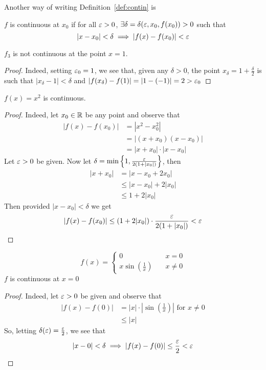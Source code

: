 Another way of writing Definition~\ref{def:contin} is
\begin{definition*}[32]
    $f$ is continuous at $x_0$ if for all $\varepsilon > 0$, $\exists\delta=\delta(\varepsilon, x_0, f(x_0)) > 0$ such that
    $$|x-x_0| < \delta \implies |f(x) - f(x_0)| < \varepsilon$$
\end{definition*}

\begin{example*}
    $f_3$ is not continuous at the point $x = 1$. 
\end{example*}
\begin{proof}
    Indeed, setting $\varepsilon_0 = 1$, 
    we see that, given any $\delta > 0$, the point $x_\delta = 1 + \frac{\delta}{2}$ is such that $|x_\delta - 1| < \delta$ and $|f(x_\delta) - f(1)| = |1-(-1)|=2 > \varepsilon_0$
\end{proof}

\begin{example*}
    $f(x) = x^2$ is continuous.
\end{example*}
\begin{proof}
    Indeed, let $x_0 \in \mathbb R$ be any point and observe that
    \begin{align*}
        |f(x) - f(x_0)| &= |x^2-x_0^2| \\
        &= |(x+x_0)(x-x_0)| \\
        &= |x+x_0|\cdot|x-x_0|
    \end{align*}
    Let $\varepsilon > 0$ be given. Now let $\delta = \min\left\{1, \frac{\varepsilon}{2(1+|x_0|)}\right\}$, then
     \begin{align*}
        |x+x_0| &= |x-x_0+2x_0| \\
        &\leq |x-x_0| + 2|x_0| \\
        &\leq 1 + 2|x_0|
    \end{align*}
    Then provided $|x - x_0| < \delta$ we get
    $$|f(x) - f(x_0)| \leq (1 + 2|x_0|)\cdot\frac{\varepsilon}{2(1 + |x_0|)} < \varepsilon$$
\end{proof}
\begin{example*}
\[ f(x) =
  \begin{cases}
    0       & \quad  x = 0\\
    x \sin\left(\frac{1}{x}\right)  & \quad x \neq 0
  \end{cases}
\]
$f$ is continuous at $x = 0$
\end{example*}
\begin{proof}
    Indeed, let $\varepsilon > 0$ be given and observe that 
    \begin{align*}
        |f(x) - f(0)| &= |x|\cdot\left|\sin\left(\frac{1}{x}\right)\right| \text{ for } x \neq 0 \\
        & \leq |x|
    \end{align*}
    So, letting $\delta(\varepsilon) = \frac{\varepsilon}{2}$, we see that
    $$|x-0| < \delta \implies |f(x)-f(0)| \leq \frac{\varepsilon}{2} < \varepsilon$$
\end{proof}

